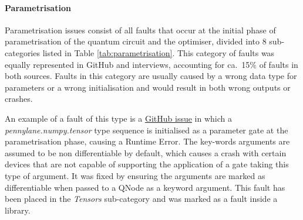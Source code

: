 

\paragraph{Parametrisation}
Parametrisation issues consist of all faults that occur at the initial phase of parametrisation of the quantum circuit and the optimiser, divided into 8 sub-categories listed in Table \ref{tab:parametrisation}. This category of faults was equally represented in GitHub and interviews, accounting for ca.\  15\% of faults in both sources. Faults in this category are usually caused by a wrong data type for parameters or a wrong initialisation and would result in both wrong outputs or crashes.

An example of a fault of this type is a \href{https://github.com/PennyLaneAI/pennylane/issues/900}{GitHub issue} in which a \textit{pennylane.numpy.tensor} type sequence is initialised as a parameter gate at the parametrisation phase, causing a Runtime Error. The key-words arguments are assumed to be non differentiable by default, which causes a crash with certain devices that  are not capable of supporting the application of a gate taking this type of argument. It was fixed by ensuring the arguments are marked as differentiable when passed to a QNode as a keyword argument. This fault has been placed in the \textit{Tensors} sub-category and was marked as a fault inside a library. 



